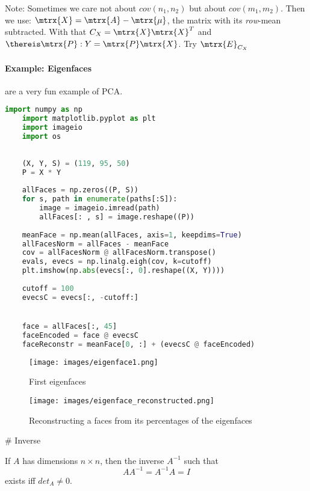 Note: Sometimes we care not about $cov(n_1, n_2)$ but about $cov(m_1, m_2)$. Then we use: $\mtrx{X} = \mtrx{A} - \mtrx{\mu}$, the matrix with its \emph{row}-mean subtracted. With that $C_X = \mtrx{X} \mtrx{X}^T$ and $\thereis \mtrx{P}: Y = \mtrx{P}\mtrx{X}$. Try $\mtrx{E}_{C_X}$

\paragraph{Example: Eigenfaces} are a very fun example of PCA.

\begin{lstlisting}[language=python]
    import numpy as np
    import matplotlib.pyplot as plt
    import imageio
    import os
    
    
    (X, Y, S) = (119, 95, 50)
    P = X * Y
    
    allFaces = np.zeros((P, S))
    for s, path in enumerate(paths[:S]):
        image = imageio.imread(path)
        allFaces[: , s] = image.reshape((P))
    
    meanFace = np.mean(allFaces, axis=1, keepdims=True)
    allFacesNorm = allFaces - meanFace
    cov = allFacesNorm @ allFacesNorm.transpose()
    evals, evecs = np.linalg.eigh(cov, k=cutoff)
    plt.imshow(np.abs(evecs[:, 0].reshape((X, Y))))
    
    cutoff = 100
    evecsC = evecs[:, -cutoff:]


    face = allFaces[:, 45]
    faceEncoded = face @ evecsC
    faceReconstr = meanFace[0, :] + (evecsC @ faceEncoded)
\end{lstlisting}

\begin{figure}[H]
    \caption{First eigenfaces}
    \centering
    \texttt{[image: images/eigenface1.png]}
\end{figure}

\begin{figure}[H]
    \caption{Reconstructing a faces from its percentages of the eigenfaces}
    \centering
    \texttt{[image: images/eigenface\_reconstructed.png]}
\end{figure}







# Inverse

If $A$ has dimensions $n \times n$, then the inverse $A^{-1}$ such that
$$ A A^{-1} = A^{-1} A = I $$
exists iff $det_A \neq 0$.


